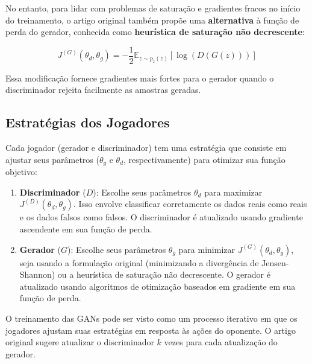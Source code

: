 \documentclass{tufte-handout}
\begin{document}
No entanto, para lidar com problemas de saturação e gradientes fracos no início do treinamento, o artigo original também propõe uma \textbf{alternativa} à função de perda do gerador, conhecida como \textbf{heurística de saturação não decrescente}:

\begin{equation}
    J^{(G)}(\theta_d, \theta_g) = - \frac{1}{2} \mathbb{E}_{z \sim p_z(z)} \left[ \log (D(G(z))) \right]
\end{equation}

Essa modificação fornece gradientes mais fortes para o gerador quando o discriminador rejeita facilmente as amostras geradas.

\subsection{Estratégias dos Jogadores}

Cada jogador (gerador e discriminador) tem uma estratégia que consiste em ajustar seus parâmetros ($\theta_g$ e $\theta_d$, respectivamente) para otimizar sua função objetivo:

\begin{enumerate}
    \item \textbf{Discriminador} ($D$): Escolhe seus parâmetros $\theta_d$ para maximizar $J^{(D)}(\theta_d, \theta_g)$. Isso envolve classificar corretamente os dados reais como reais e os dados falsos como falsos. O discriminador é atualizado usando gradiente ascendente em sua função de perda.
    \item \textbf{Gerador} ($G$): Escolhe seus parâmetros $\theta_g$ para minimizar $J^{(G)}(\theta_d, \theta_g)$, seja usando a formulação original (minimizando a divergência de Jensen-Shannon) ou a heurística de saturação não decrescente. O gerador é atualizado usando algoritmos de otimização baseados em gradiente em sua função de perda.
\end{enumerate}

O treinamento das GANs pode ser visto como um processo iterativo em que os jogadores ajustam suas estratégias em resposta às ações do oponente. O artigo original sugere atualizar o discriminador $k$ vezes para cada atualização do gerador.
\end{document}

